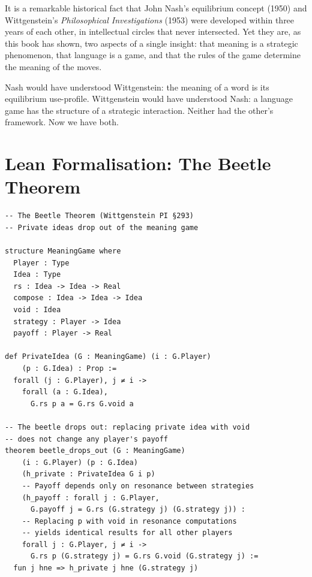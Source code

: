 \begin{remark}
It is a remarkable historical fact that John Nash's equilibrium
concept (1950) and Wittgenstein's \textit{Philosophical
Investigations} (1953) were developed within three years of each
other, in intellectual circles that never intersected.  Yet they
are, as this book has shown, two aspects of a single insight:
that meaning is a strategic phenomenon, that language is a game,
and that the rules of the game determine the meaning of the moves.

Nash would have understood Wittgenstein: the meaning of a word
is its equilibrium use-profile.  Wittgenstein would have understood
Nash: a language game has the structure of a strategic interaction.
Neither had the other's framework.  Now we have both.
\end{remark}

\section{Lean Formalisation: The Beetle Theorem}
\label{sec:synthesis-lean}

\begin{lstlisting}[caption={The beetle theorem in Lean 4},label={lst:beetle}]
-- The Beetle Theorem (Wittgenstein PI §293)
-- Private ideas drop out of the meaning game

structure MeaningGame where
  Player : Type
  Idea : Type
  rs : Idea -> Idea -> Real
  compose : Idea -> Idea -> Idea
  void : Idea
  strategy : Player -> Idea
  payoff : Player -> Real

def PrivateIdea (G : MeaningGame) (i : G.Player)
    (p : G.Idea) : Prop :=
  forall (j : G.Player), j ≠ i ->
    forall (a : G.Idea),
      G.rs p a = G.rs G.void a

-- The beetle drops out: replacing private idea with void
-- does not change any player's payoff
theorem beetle_drops_out (G : MeaningGame)
    (i : G.Player) (p : G.Idea)
    (h_private : PrivateIdea G i p)
    -- Payoff depends only on resonance between strategies
    (h_payoff : forall j : G.Player,
      G.payoff j = G.rs (G.strategy j) (G.strategy j)) :
    -- Replacing p with void in resonance computations
    -- yields identical results for all other players
    forall j : G.Player, j ≠ i ->
      G.rs p (G.strategy j) = G.rs G.void (G.strategy j) :=
  fun j hne => h_private j hne (G.strategy j)
\end{lstlisting}

